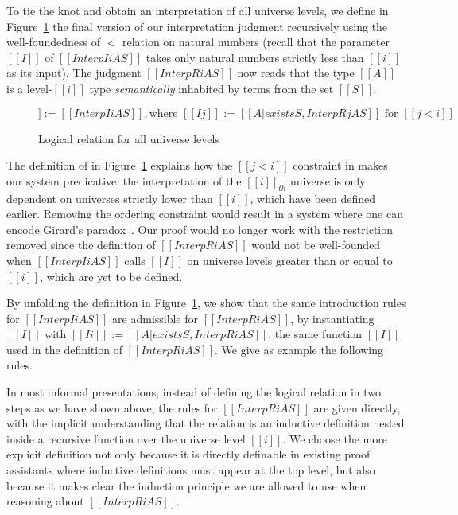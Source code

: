 \documentclass[acmsmall,screen=true,
\ifpublic review=false\else,review=true\fi
  ,anonymous=\ifanonymous true\else false\fi]{acmart}
\begin{document}
To tie the knot and obtain an interpretation of all universe levels,
we define in Figure~\ref{fig:logrelrec} the final version of our interpretation judgment recursively
using the well-foundedness of $<$ relation on natural
numbers (recall that
the parameter $[[I]]$ of $[[Interp I i A S]]$ takes only natural
numbers strictly less than $[[i]]$ as its input).
The judgment $[[InterpR i A S]]$ now reads that the type $[[A]]$ is a
level-$[[i]]$ type \emph{semantically} inhabited by terms from the set
$[[S]]$.

\begin{figure}[h]
\begin{equation*}
    [[InterpR i A S]] := [[ Interp I i A S  ]], \text{where } [[I j]]
    := [[{A | exists S , InterpR j A S}]] \text{ for } [[j < i]]
\end{equation*}
\caption{Logical relation for all universe levels}
\label{fig:logrelrec}
\end{figure}
The definition of in Figure~\ref{fig:logrelrec} explains how the $[[j
< i]]$ constraint in  makes our system predicative; the
interpretation of the $[[i]]_{th}$ universe is only dependent on
universes strictly lower than $[[i]]$, which have been defined earlier.
Removing the ordering constraint would result in a
system where one can encode Girard's
paradox~\citep{girard-thesis}. Our proof would no longer work with the
restriction removed since the definition of $[[InterpR i A S]]$ would
not be well-founded when $[[Interp I i A S]]$ calls $[[I]]$ on
universe levels greater than or equal to $[[i]]$, which are yet to be defined.

By unfolding the definition in Figure~\ref{fig:logrelrec}, we
show that the same introduction rules for $[[Interp I i A S]]$ are
admissible for $[[InterpR i A S]]$, by
instantiating $[[I]]$ with $[[I i]] := [[{A | exists S , InterpR i A
  S}]]$, the same function $[[I]]$ used in the definition of $[[InterpR i A
S]]$. We give as example the following rules.
\begin{center}
 \qquad {}
\end{center}

In most informal presentations, instead of defining the logical
relation in two steps as we have shown above, the rules for $[[InterpR
i A S]]$ are given directly, with the implicit understanding that the
relation is an inductive definition nested inside a recursive
function over the universe level $[[i]]$. We choose
the more explicit definition not only because it is directly definable
in existing proof assistants where inductive definitions must appear
at the top level, but also because it makes clear the induction
principle we are allowed to use when reasoning about $[[InterpR i A
S]]$.
\end{document}
